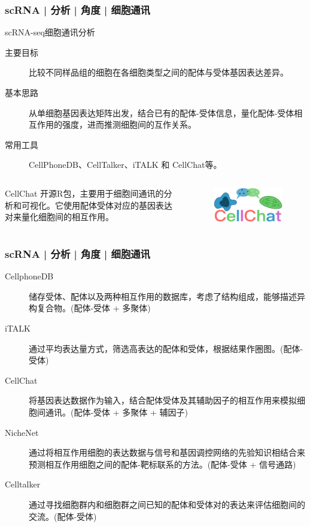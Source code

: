 \documentclass[11pt]{ctexbeamer}
\begin{document}
\begin{frame}
	\frametitle{scRNA | 分析 | 角度 | 细胞通讯}
	\begin{block}{scRNA-seq细胞通讯分析}
		\begin{description}
			\item[主要目标] 比较不同样品组的细胞在各细胞类型之间的配体与受体基因表达差异。
			\item[基本思路] 从单细胞基因表达矩阵出发，结合已有的配体-受体信息，量化配体-受体相互作用的强度，进而推测细胞间的互作关系。
			\item[常用工具] CellPhoneDB、CellTalker、iTALK 和 CellChat等。
		\end{description}
    \end{block}
		\begin{columns}
	\begin{block}{CellChat}
         开源R包，主要用于细胞间通讯的分析和可视化。它使用配体受体对应的基因表达对来量化细胞间的相互作用。
	\end{block}
	\begin{figure}
		\includegraphics[width=\textwidth]{scRNA_cellchat_logo.png}
	\end{figure}
\end{columns}
\end{frame}

\begin{frame}
	\frametitle{scRNA | 分析 | 角度 | 细胞通讯}
		\begin{description}
			\item[CellphoneDB] 储存受体、配体以及两种相互作用的数据库，考虑了结构组成，能够描述异构复合物。(配体-受体 + 多聚体)
			\item[iTALK] 通过平均表达量方式，筛选高表达的配体和受体，根据结果作圈图。(配体-受体)
			\item[CellChat] 将基因表达数据作为输入，结合配体受体及其辅助因子的相互作用来模拟细胞间通讯。(配体-受体 + 多聚体 + 辅因子)
			\item[NicheNet] 通过将相互作用细胞的表达数据与信号和基因调控网络的先验知识相结合来预测相互作用细胞之间的配体-靶标联系的方法。(配体-受体 + 信号通路)
			\item[Celltalker] 通过寻找细胞群内和细胞群之间已知的配体和受体对的表达来评估细胞间的交流。(配体-受体)
		\end{description}
\end{frame}
\end{document}
